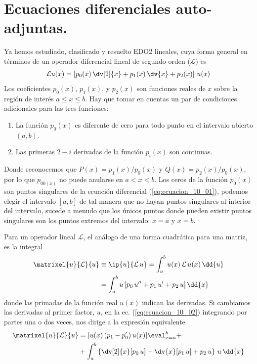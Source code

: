 \section{Ecuaciones diferenciales auto-adjuntas.}
Ya hemos estudiado, clasificado y resuelto EDO2 lineales, cuya forma general en términos de un operador diferencial lineal de segundo orden ($\mathcal{L}$) es
\begin{align}
\mathcal{L} u(x) = \left[ p_{0}(x) \, \dv[2]{x} + p_{1}(x) \, \dv{x} + p_{2}(x) \right] \, u(x)
\label{eq:ecuacion_10_01}
\end{align}
Los coeficientes $p_{0} (x)$, $p_{1} (x)$, y $p_{2} (x)$ son funciones reales de $x$ sobre la región de interés $a \leq x \leq b$. Hay que tomar en cuentas un par de condiciones adicionales para las tres funciones:
\begin{enumerate}
\item La función $p_{0}(x)$ es diferente de cero para todo punto en el intervalo abierto $(a,b)$.
\item Las primeras $2-i$ derivadas de la función $p_{i}(x)$ son continuas.
\end{enumerate}
Donde reconocemos que $P(x) = p_{1}(x)/p_{0}(x)$ y $Q(x)= p_{2}(x)/p_{0}(x)$, por lo que $p_{00(x)}$ no puede anularse en $a < x < b$. Los ceros de la función $p_{0}(x)$ son puntos singulares de la ecuación diferencial (\ref{eq:ecuacion_10_01}), podemos elegir el intervalo $[a, b]$ de tal manera que no hayan puntos singulares al interior del intervalo, sucede a menudo que los únicos puntos donde pueden existir puntos singulares son los puntos extremos del intervalo: $x = a$ y $x = b$.
\par
Para un operador lineal $\mathcal{L}$, el análogo de una forma cuadrática para una matriz, es la integral
\begin{align}
\begin{aligned}
\matrixel{u}{\mathcal{L}}{u} &\equiv \ip{u}{\mathcal{L} \, u} = \int_{a}^{b} u(x) \, \mathcal{L} \, u(x) \, \dd{u} \\
&= \int_{a}^{b} u \, [ p_{0} \, u^{\prime \prime} + p_{1} \, u^{\prime} + p_{2} \, u ] \, \dd{x}
\end{aligned}
\label{eq:ecuacion_10_02}
\end{align}
donde las primadas de la función real $u(x)$ indican las derivadas. Si cambiamos las derivadas al primer factor, $u$, en la ec. (\ref{eq:ecuacion_10_02}) integrando por partes una o dos veces, nos dirige a la expresión equivalente
\begin{align}
\begin{aligned}
\matrixel{u}{\mathcal{L}}{u} &= [ u(x) \, ( p_{1} - p_{0}^{\prime} ) \, u(x)] \eval_{x=a}^{b} + \\
&+ \int_{a}^{b} \left\{ \dv[2]{x} [p_{0} \, u] - \dv{x} [p_{1} \, u] + p_{2} \, u \right\} \, u \, \dd{x}
\end{aligned}
\label{eq:ecuacion_10_03}
\end{align}
